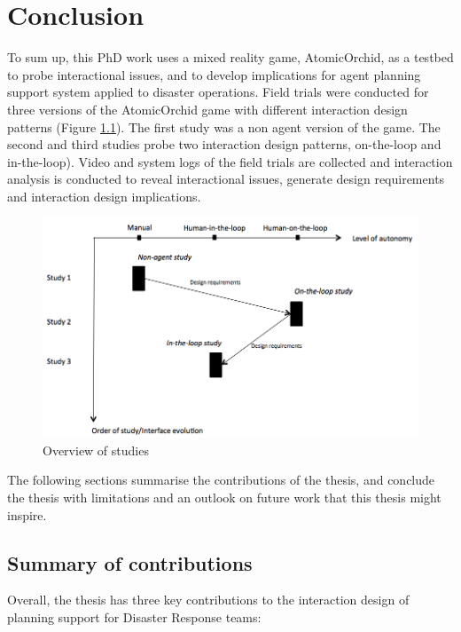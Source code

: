 \chapter{Conclusion}\label{ch:conclusion}
To sum up, this PhD work uses a mixed reality game, AtomicOrchid, as a testbed to probe interactional issues, and to develop implications for agent planning support system applied to disaster operations. Field trials were conducted for three versions of the AtomicOrchid game with different interaction design patterns (Figure \ref{fig:connections}). The first study was a non agent version of the game. The second and third studies probe two interaction design patterns, on-the-loop and in-the-loop). Video and system logs of the field trials are collected and interaction analysis is conducted to reveal interactional issues, generate design requirements and interaction design implications. \\

\begin{figure}[H]
  \centering
  \includegraphics[width=1\textwidth]{img/conclusion/studies}
  \caption{Overview of studies}
  \label{fig:connections}
\end{figure}

The following sections summarise the contributions of the thesis, and conclude the thesis with limitations and an outlook on future work that this thesis might inspire.\\


\section{Summary of contributions}
Overall, the thesis has three key contributions to the interaction design of planning support for Disaster Response teams:\\

